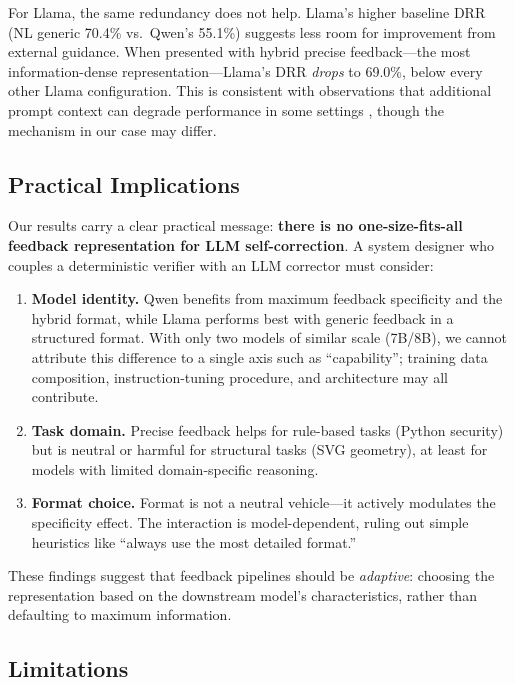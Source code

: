 For Llama, the same redundancy does not help. Llama's higher baseline DRR (NL generic 70.4\% vs.\ Qwen's 55.1\%) suggests less room for improvement from external guidance. When presented with hybrid precise feedback---the most information-dense representation---Llama's DRR \emph{drops} to 69.0\%, below every other Llama configuration. This is consistent with observations that additional prompt context can degrade performance in some settings \cite{shi2023large}, though the mechanism in our case may differ.

\subsection{Practical Implications}

Our results carry a clear practical message: \textbf{there is no one-size-fits-all feedback representation for LLM self-correction}. A system designer who couples a deterministic verifier with an LLM corrector must consider:

\begin{enumerate}
    \item \textbf{Model identity.} Qwen benefits from maximum feedback specificity and the hybrid format, while Llama performs best with generic feedback in a structured format. With only two models of similar scale (7B/8B), we cannot attribute this difference to a single axis such as ``capability''; training data composition, instruction-tuning procedure, and architecture may all contribute.
    \item \textbf{Task domain.} Precise feedback helps for rule-based tasks (Python security) but is neutral or harmful for structural tasks (SVG geometry), at least for models with limited domain-specific reasoning.
    \item \textbf{Format choice.} Format is not a neutral vehicle---it actively modulates the specificity effect. The interaction is model-dependent, ruling out simple heuristics like ``always use the most detailed format.''
\end{enumerate}

These findings suggest that feedback pipelines should be \emph{adaptive}: choosing the representation based on the downstream model's characteristics, rather than defaulting to maximum information.

\subsection{Limitations}

